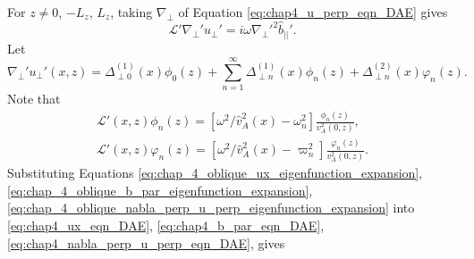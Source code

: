 For $z\ne0$, $-L_z$, $L_z$, taking $\nabla_\perp$ of Equation \eqref{eq:chap4_u_perp_eqn_DAE} gives
\begin{equation}
    \label{eq:chap4_nabla_perp_u_perp_eqn_DAE}
    \mathcal{L}'\nabla_\perp' u_\perp' = i\omega \nabla_\perp'^2 \hat{b}_{||}'.
\end{equation}
Let 
\begin{equation}
    \label{eq:chap_4_oblique_nabla_perp_u_perp_eigenfunction_expansion}
    \nabla_\perp'u_\perp'(x,z) = \Delta_{\perp0}^{(1)}(x)\phi_0(z) + \sum_{n=1}^\infty \Delta_{\perp n}^{(1)}(x)\phi_n(z) + \Delta_{\perp n}^{(2)}(x)\varphi_n(z).
\end{equation}
Note that
\begin{gather}
    \mathcal{L}'(x,z)\phi_n(z) = [\omega^2/\hat{v}_A^2(x) - \omega_n^2]\frac{\phi_n(z)}{v_A^2(0,z)}, \\
    \mathcal{L}'(x,z)\varphi_n(z) = [\omega^2/\hat{v}_A^2(x) - \varpi_n^2]\frac{\varphi_n(z)}{v_A^2(0,z)}.
\end{gather}
Substituting Equations \eqref{eq:chap_4_oblique_ux_eigenfunction_expansion}, \eqref{eq:chap_4_oblique_b_par_eigenfunction_expansion}, \eqref{eq:chap_4_oblique_nabla_perp_u_perp_eigenfunction_expansion} into \eqref{eq:chap4_ux_eqn_DAE}, \eqref{eq:chap4_b_par_eqn_DAE}, \eqref{eq:chap4_nabla_perp_u_perp_eqn_DAE}, gives
